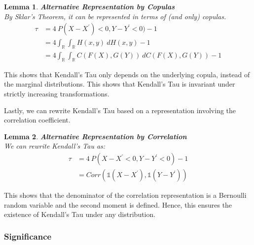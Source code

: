 \documentclass[12pt]{report}
\newtheorem{lemma}{Lemma}[subsection]
\newcommand{\1}{\mathbf{1}}
\begin{document}
\begin{flushleft}
\begin{lemma}
\label{KendallTauGeneralizationCopulas}
\textit{\normalfont\parencite{HofertBook}}\:\textbf{Alternative Representation by Copulas}\\

By Sklar's Theorem, it can be represented in terms of (and only) copulas.
\begin{align*}
\tau &= 4 \: P (X - X^{'}) < 0, Y - Y^{'} < 0) - 1\\
&= 4 \int_{\mathbb{R}} \int_{\mathbb{R}} H(x,y) \: dH(x,y) - 1 \\
&= 4 \int_{\mathbb{R}} \int_{\mathbb{R}} C(F(X),G(Y)) \: dC(F(X),G(Y)) - 1
\end{align*}
\end{lemma}

This shows that Kendall's Tau only depends on the underlying copula, instead of the marginal distributions. This shows that Kendall's Tau is invariant under strictly increasing transformations.

Lastly, we can rewrite Kendall's Tau based on a representation involving the correlation coefficient. 

\begin{lemma}
\label{KendallTauGeneralizationCorrelation}
\textit{\normalfont\parencite{HofertBook}} \:\textbf{Alternative Representation by Correlation}\\
We can rewrite Kendall's Tau as:
\begin{align*}
\tau &= 4 \: P (X - X^{'} < 0, Y - Y^{'} < 0) - 1\\
&= Corr \left( \mathds{1}(X - X^{'}), \mathds{1}(Y - Y^{'}) \right)
\end{align*}
\end{lemma}

This shows that the denominator of the correlation representation is a Bernoulli random variable and the second moment is defined. Hence, this ensures the existence of Kendall's Tau under any distribution.

\newpage
\subsubsection{Significance}


\end{flushleft}
\end{document}
